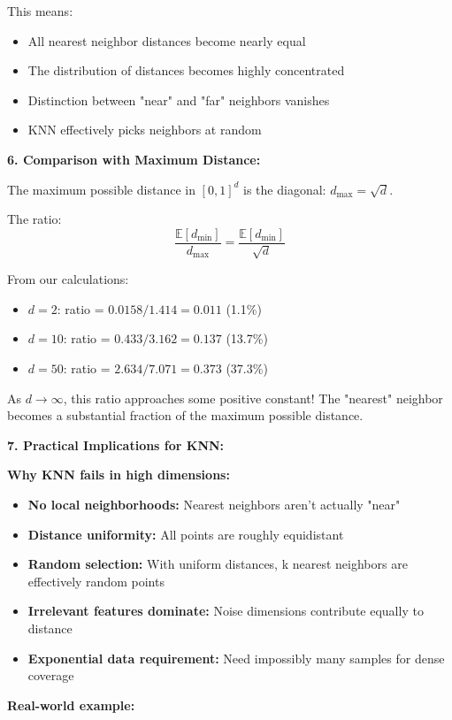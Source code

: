 \documentclass[12pt]{article}
\begin{document}
\begin{explanation}
This means:
\begin{itemize}
    \item All nearest neighbor distances become nearly equal
    \item The distribution of distances becomes highly concentrated
    \item Distinction between "near" and "far" neighbors vanishes
    \item KNN effectively picks neighbors at random
\end{itemize}

\textbf{6. Comparison with Maximum Distance:}

The maximum possible distance in \([0,1]^d\) is the diagonal: \(d_{\max} = \sqrt{d}\).

The ratio:
\[
\frac{\mathbb{E}[d_{\min}]}{d_{\max}} = \frac{\mathbb{E}[d_{\min}]}{\sqrt{d}}
\]

From our calculations:
\begin{itemize}
    \item \(d=2\): ratio = \(0.0158/1.414 = 0.011\) (1.1\%)
    \item \(d=10\): ratio = \(0.433/3.162 = 0.137\) (13.7\%)
    \item \(d=50\): ratio = \(2.634/7.071 = 0.373\) (37.3\%)
\end{itemize}

As \(d \to \infty\), this ratio approaches some positive constant! The "nearest" neighbor becomes a substantial fraction of the maximum possible distance.

\textbf{7. Practical Implications for KNN:}

\textbf{Why KNN fails in high dimensions:}

\begin{itemize}
    \item \textbf{No local neighborhoods:} Nearest neighbors aren't actually "near"
    \item \textbf{Distance uniformity:} All points are roughly equidistant
    \item \textbf{Random selection:} With uniform distances, k nearest neighbors are effectively random points
    \item \textbf{Irrelevant features dominate:} Noise dimensions contribute equally to distance
    \item \textbf{Exponential data requirement:} Need impossibly many samples for dense coverage
\end{itemize}

\textbf{Real-world example:}


\end{explanation}
\end{document}

